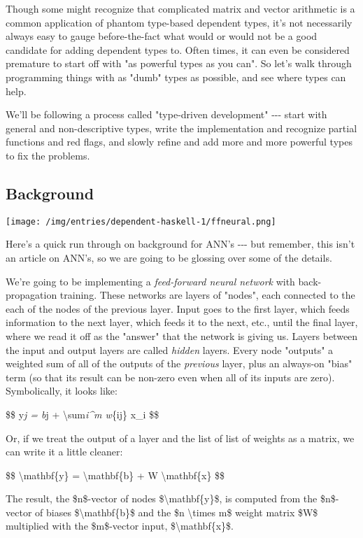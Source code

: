 \documentclass[]{article}
\begin{document}
Though some might recognize that complicated matrix and vector arithmetic is a
common application of phantom type-based dependent types, it's not necessarily
always easy to gauge before-the-fact what would or would not be a good candidate
for adding dependent types to. Often times, it can even be considered premature
to start off with "as powerful types as you can". So let's walk through
programming things with as "dumb" types as possible, and see where types can
help.

We'll be following a process called "type-driven development" -\/-\/- start with
general and non-descriptive types, write the implementation and recognize
partial functions and red flags, and slowly refine and add more and more
powerful types to fix the problems.

\subsection{Background}

\texttt{[image: /img/entries/dependent-haskell-1/ffneural.png]}

Here's a quick run through on background for ANN's -\/-\/- but remember, this
isn't an article on ANN's, so we are going to be glossing over some of the
details.

We're going to be implementing a \emph{feed-forward neural network} with
back-propagation training. These networks are layers of "nodes", each connected
to the each of the nodes of the previous layer. Input goes to the first layer,
which feeds information to the next layer, which feeds it to the next, etc.,
until the final layer, where we read it off as the "answer" that the network is
giving us. Layers between the input and output layers are called \emph{hidden}
layers. Every node "outputs" a weighted sum of all of the outputs of the
\emph{previous} layer, plus an always-on "bias" term (so that its result can be
non-zero even when all of its inputs are zero). Symbolically, it looks like:

\$\$ y\emph{j = b}j + \textbackslash{}sum\emph{i\^{}m w}\{ij\} x\_i \$\$

Or, if we treat the output of a layer and the list of list of weights as a
matrix, we can write it a little cleaner:

\$\$ \textbackslash{}mathbf\{y\} = \textbackslash{}mathbf\{b\} + W
\textbackslash{}mathbf\{x\} \$\$

The result, the \$n\$-vector of nodes \$\textbackslash{}mathbf\{y\}\$, is
computed from the \$n\$-vector of biases \$\textbackslash{}mathbf\{b\}\$ and the
\$n \textbackslash{}times m\$ weight matrix \$W\$ multiplied with the
\$m\$-vector input, \$\textbackslash{}mathbf\{x\}\$.
\end{document}

